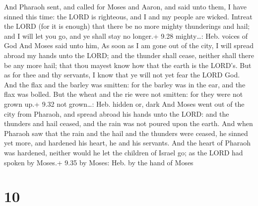 And Pharaoh sent, and called for Moses and Aaron, and
said unto them, I have sinned this time: the LORD is righteous, and I
and my people are wicked.  Intreat the LORD (for it is
enough) that there be no more mighty thunderings and hail; and I will
let you go, and ye shall stay no longer.+ 9.28 mighty\ldots: Heb. voices
of God  And Moses said unto him, As soon as I am gone out
of the city, I will spread abroad my hands unto the LORD; and the
thunder shall cease, neither shall there be any more hail; that thou
mayest know how that the earth is the LORD's.  But as for
thee and thy servants, I know that ye will not yet fear the LORD God.
 And the flax and the barley was smitten: for the barley
was in the ear, and the flax was bolled.  But the wheat and
the rie were not smitten: for they were not grown up.+ 9.32 not
grown\ldots: Heb. hidden or, dark  And Moses went out of
the city from Pharaoh, and spread abroad his hands unto the LORD: and
the thunders and hail ceased, and the rain was not poured upon the
earth.  And when Pharaoh saw that the rain and the hail and
the thunders were ceased, he sinned yet more, and hardened his heart, he
and his servants.  And the heart of Pharaoh was hardened,
neither would he let the children of Israel go; as the LORD had spoken
by Moses.+ 9.35 by Moses: Heb. by the hand of Moses

\hypertarget{section-9}{%
\section{10}\label{section-9}}

